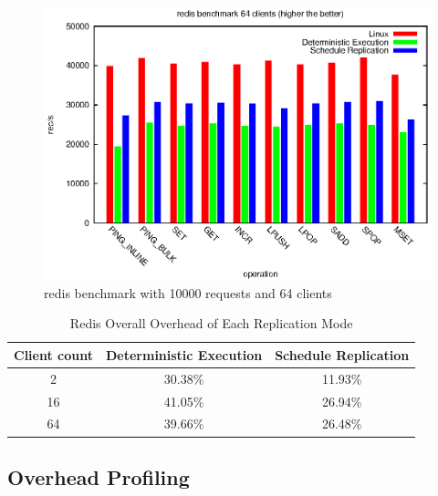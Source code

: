 \begin{figure}
\centering
\includegraphics[width=0.8\columnwidth]{figures/redis_64}
\caption{redis benchmark with 10000 requests and 64 clients}
\label{f:redis_64}
\end{figure}

\begin{table}
\caption{Redis Overall Overhead of Each Replication Mode}
\begin{center}
 \begin{tabular}{c | c | c}
Client count & Deterministic Execution & Schedule Replication \\ \hline
 2 & 30.38\% & 11.93\% \\ \hline
 16 & 41.05\% & 26.94\% \\ \hline
 64 & 39.66\% & 26.48\% \\ \hline
 \end{tabular}
\end{center}
\label{t:redis_overall}
\end{table}

\subsection{Overhead Profiling}
